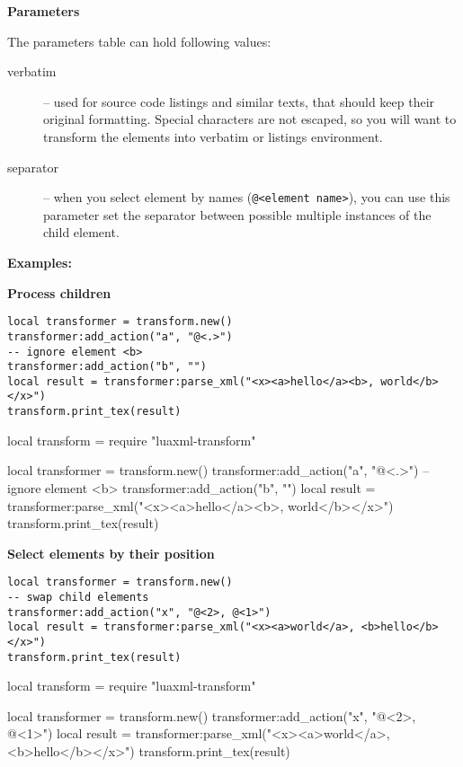 \documentclass{ltxdoc}
\begin{document}
\noindent\textbf{Parameters}

The parameters table can hold following values:

\begin{description}
  \item[verbatim] -- used for source code listings and similar texts, that should keep their original formatting. 
    Special characters are not escaped, so you will want to transform the elements into verbatim or listings environment.
  \item[separator] -- when you select element by names (\verb|@<element name>|), you can use this parameter
    set the separator between possible multiple instances of the child element.
\end{description}

\noindent\textbf{Examples:}

\noindent\textbf{Process children}

\begin{verbatim}
local transformer = transform.new()
transformer:add_action("a", "@<.>")
-- ignore element <b>
transformer:add_action("b", "")
local result = transformer:parse_xml("<x><a>hello</a><b>, world</b></x>")
transform.print_tex(result)
\end{verbatim}
\begin{framed}
\begin{luacode*}

local transform = require "luaxml-transform"

local transformer = transform.new()
transformer:add_action("a", "@<.>")
-- ignore element <b>
transformer:add_action("b", "")
local result = transformer:parse_xml("<x><a>hello</a><b>, world</b></x>")
transform.print_tex(result)
\end{luacode*}
\end{framed}

\noindent\textbf{Select elements by their position}

\begin{verbatim}
local transformer = transform.new()
-- swap child elements
transformer:add_action("x", "@<2>, @<1>")
local result = transformer:parse_xml("<x><a>world</a>, <b>hello</b></x>")
transform.print_tex(result)
\end{verbatim}

\begin{framed}
\begin{luacode*}

local transform = require "luaxml-transform"

local transformer = transform.new()
transformer:add_action("x", "@<2>, @<1>")
local result = transformer:parse_xml("<x><a>world</a>, <b>hello</b></x>")
transform.print_tex(result)
\end{luacode*}
\end{framed}
\end{document}
